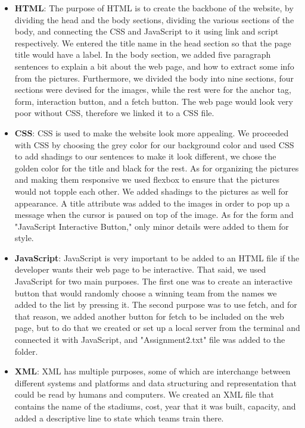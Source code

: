 \documentclass{article}
\begin{document}
\begin{itemize}
    \item \textbf{HTML}: The purpose of HTML is to create the backbone of the website, by dividing the head and the body sections, dividing the various sections of the body, and connecting the CSS and JavaScript to it using link and script respectively. We entered the title name in the head section so that the page title would have a label. In the body section, we added five paragraph sentences to explain a bit about the web page, and how to extract some info from the pictures. Furthermore, we divided the body into nine sections, four sections were devised for the images, while the rest were for the anchor tag, form, interaction button, and a fetch button. The web page would look very poor without CSS, therefore we linked it to a CSS file.

    \item \textbf{CSS}: CSS is used to make the website look more appealing. We proceeded with CSS by choosing the grey color for our background color and used CSS to add shadings to our sentences to make it look different, we chose the golden color for the title and black for the rest. As for organizing the pictures and making them responsive we used flexbox to ensure that the pictures would not topple each other. We added shadings to the pictures as well for appearance. A title attribute was added to the images in order to pop up a message when the cursor is paused on top of the image. As for the form and "JavaScript Interactive Button," only minor details were added to them for style.

    \item \textbf{JavaScript}: JavaScript is very important to be added to an HTML file if the developer wants their web page to be interactive. That said, we used JavaScript for two main purposes. The first one was to create an interactive button that would randomly choose a winning team from the names we added to the list by pressing it. The second purpose was to use fetch, and for that reason, we added another button for fetch to be included on the web page, but to do that we created or set up a local server from the terminal and connected it with JavaScript, and "Assignment2.txt" file was added to the folder.

    \item \textbf{XML}: XML has multiple purposes, some of which are interchange between different systems and platforms and data structuring and representation that could be read by humans and computers. We created an XML file that contains the name of the stadiums, cost, year that it was built, capacity, and added a descriptive line to state which teams train there.


\end{itemize}
\end{document}
